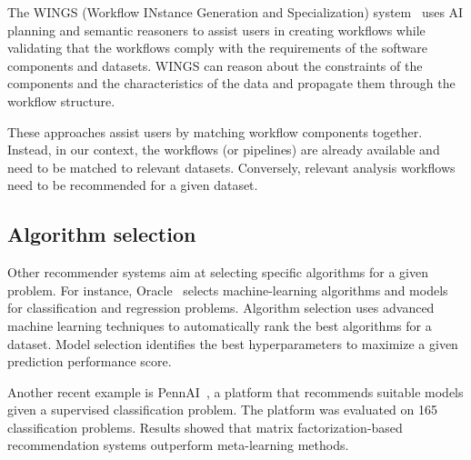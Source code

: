 
The WINGS (Workflow INstance Generation and Specialization) system~\cite{gil2010wings} uses AI planning and semantic reasoners to assist users in creating workflows while validating that the workflows comply with the requirements of the software components and datasets. WINGS can reason about the constraints of the components and the characteristics of the data and propagate them through the workflow structure.

These approaches assist users by matching workflow components together. Instead, in our context, the workflows (or pipelines) are already available and need to be matched to relevant datasets. Conversely, relevant analysis workflows need to be recommended for a given dataset.

\subsection{Algorithm selection}

Other recommender systems aim at selecting specific algorithms for a given problem. For instance, Oracle~\cite{oracle} selects machine-learning algorithms and models for classiﬁcation and regression problems. Algorithm selection uses advanced machine learning techniques to automatically rank the best algorithms for a dataset. Model selection identifies the best hyperparameters to maximize a given prediction performance score. 

Another recent example is PennAI~\cite{la2021evaluating}, a platform that recommends suitable models given a supervised classification problem. The platform was evaluated on 165 classification problems. Results showed that matrix factorization-based recommendation systems outperform meta-learning methods.

